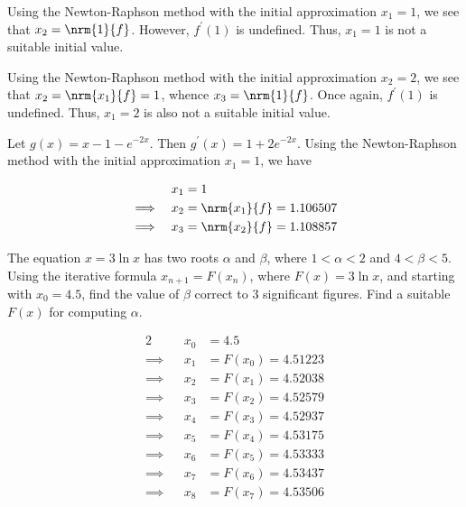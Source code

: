 \documentclass{jhwhw}
\begin{document}
            Using the Newton-Raphson method with the initial approximation $x_1 = 1$, we see that $x_2 = \nrm{1}{f}$. However, $f^\prime(1)$ is undefined. Thus, $x_1 = 1$ is not a suitable initial value.

            Using the Newton-Raphson method with the initial approximation $x_2 = 2$, we see that $x_2 = \nrm{x_1}{f} = 1$, whence $x_3 = \nrm{1}{f}$. Once again, $f^\prime(1)$ is undefined. Thus, $x_1 = 2$ is also not a suitable initial value.

            Let $g(x) = x-1-e^{-2x}$. Then $g^\prime(x) = 1+2e^{-2x}$. Using the Newton-Raphson method with the initial approximation $x_1=1$, we have

            \begin{alignat*}{2}
                && x_1 &= 1 \\
                \implies&&x_2 &= \nrm{x_1}{f} = 1.106507 \\
                \implies&&x_3 &= \nrm{x_2}{f} = 1.108857
            \end{alignat*}

            

    \problem{}
        The equation $x = 3\ln x$ has two roots $\alpha$ and $\beta$, where $1 < \alpha < 2$ and $4 < \beta < 5$. Using the iterative formula $x_{n+1} = F(x_n)$, where $F(x) = 3 \ln x$, and starting with $x_0 = 4.5$, find the value of $\beta$ correct to 3 significant figures. Find a suitable $F(x)$ for computing $\alpha$.

    \solution
        \begin{alignat*}{2}
            && x_0 &= 4.5 \\
            \implies&&x_1 &= F(x_0) = 4.51223 \\
            \implies&&x_2 &= F(x_1) = 4.52038 \\
            \implies&&x_3 &= F(x_2) = 4.52579 \\
            \implies&&x_4 &= F(x_3) = 4.52937 \\
            \implies&&x_5 &= F(x_4) = 4.53175 \\
            \implies&&x_6 &= F(x_5) = 4.53333 \\
            \implies&&x_7 &= F(x_6) = 4.53437 \\
            \implies&&x_8 &= F(x_7) = 4.53506
        \end{alignat*}

\end{document}
